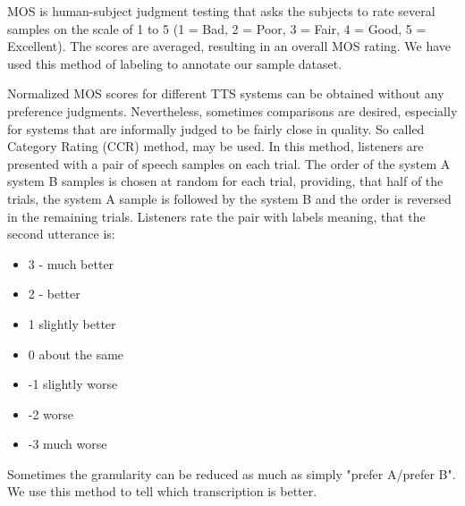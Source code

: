 MOS is human-subject judgment testing that asks the subjects to rate several samples on the scale of 1 to 5 (1 = Bad, 2 = Poor, 3 = Fair, 4 = Good, 5 = Excellent).
The scores are averaged, resulting in an overall MOS rating.
We have used this method of labeling to annotate our sample dataset.
\par
Normalized MOS scores for different TTS systems can be obtained without any preference judgments.
Nevertheless, sometimes comparisons are desired, especially for systems that are informally judged to be fairly close in quality.
So called Category Rating (CCR) method, may be used.
In this method, listeners are presented with a pair of speech samples on each trial. The order of the system A system B samples is chosen at random for each trial, providing, that half of the trials, the system A sample is followed by the system B and the order is reversed in the remaining trials.
Listeners rate the pair with labels meaning, that the second utterance is:
\begin{itemize}
\item 3 - much better
\item 2 - better
\item 1 slightly better
\item 0 about the same
\item -1 slightly worse
\item -2 worse
\item -3 much worse
\end{itemize}
Sometimes the granularity can be reduced as much as simply "prefer A/prefer B".
We use this method to tell which transcription is better.